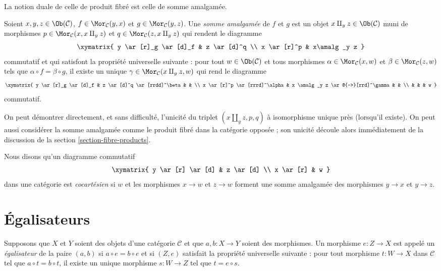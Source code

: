 \noindent
La notion duale de celle de produit fibré est celle de somme amalgamée.

\begin{definition}
\label{definition-pushouts}
Soient $x, y, z\in \Ob(\mathcal{C})$,
$f\in \Mor_\mathcal{C}(y, x)$
et $g\in \Mor_{\mathcal C}(y, z)$.
Une {\it somme amalgamée} de $f$ et $g$ est
un objet $x\amalg_y z\in \Ob(\mathcal{C})$
muni de morphismes
$p\in \Mor_{\mathcal C}(x, x\amalg_y z)$ et
$q\in\Mor_{\mathcal C}(z, x\amalg_y z)$ qui rendent le diagramme
$$
\xymatrix{
y \ar[r]_g \ar[d]_f & z \ar[d]^q \\
x \ar[r]^p & x\amalg_y z
}
$$
commutatif et qui satisfont la propriété universelle suivante :
pour tout $w\in \Ob(\mathcal{C})$ et tous morphismes
$\alpha \in \Mor_{\mathcal C}(x, w)$ et
$\beta \in \Mor_\mathcal{C}(z, w)$ tels que
$\alpha \circ f = \beta \circ g$, il existe un unique
$\gamma\in \Mor_{\mathcal C}(x\amalg_y z, w)$ qui rend le diagramme
$$
\xymatrix{
y \ar[r]_g \ar[d]_f & z \ar[d]^q \ar[rrdd]^\beta & & \\
x \ar[r]^p \ar[rrrd]^\alpha & x \amalg_y z \ar@{-->}[rrd]^\gamma & & \\
& & & w
}
$$
commutatif.
\end{definition}

\noindent
On peut démontrer directement, et sans difficulté, l'unicité du triplet
$(x\amalg_y z, p, q)$ à isomorphisme unique près (lorsqu'il existe).
On peut aussi considérer la somme amalgamée comme le
produit fibré dans la catégorie opposée ; son unicité découle alors
immédiatement de la discussion de la section \ref{section-fibre-products}.

\begin{definition}
\label{definition-cocartesian}
Nous disons qu'un diagramme commutatif
$$
\xymatrix{
y \ar[r] \ar[d] & z \ar[d] \\
x \ar[r] & w
}
$$
dans une catégorie est {\it cocartésien} si $w$ et les morphismes
$x \to w$ et $z \to w$ forment une somme amalgamée des morphismes
$y \to x$ et $y \to z$.
\end{definition}


\section{Égalisateurs}
\label{section-equalizers}

\begin{definition}
\label{definition-equalizers}
Supposons que $X$ et $Y$ soient des objets d'une catégorie $\mathcal{C}$
et que $a, b : X \to Y$ soient des morphismes. Un morphisme
$e : Z \to X$ est appelé un {\it égalisateur} de la paire $(a, b)$ si
$a \circ e = b \circ e$ et si $(Z, e)$ satisfait la propriété universelle
suivante : pour tout morphisme $t : W \to X$
dans $\mathcal{C}$ tel que $a \circ t = b \circ t$, il existe
un unique morphisme $s : W \to Z$ tel que $t = e \circ s$.
\end{definition}


